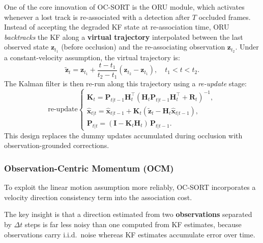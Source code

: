 \documentclass[10pt,twocolumn,letterpaper]{article}
\begin{document}
One of the core innovation of OC-SORT is the ORU module, which activates whenever a lost track is re-associated with a detection after $T$ occluded frames. Instead of accepting the degraded KF state at re-association time, ORU \textit{backtracks} the KF along a \textbf{virtual trajectory} interpolated between the last observed state $\mathbf{z}_{t_1}$ (before occlusion) and the re-associating observation $\mathbf{z}_{t_2}$. Under a constant-velocity assumption, the virtual trajectory is:
\begin{equation}
    \tilde{\mathbf{z}}_t = \mathbf{z}_{t_1} + \frac{t - t_1}{t_2 - t_1}(\mathbf{z}_{t_2} - \mathbf{z}_{t_1}),
    \quad t_1 < t < t_2.
\end{equation}
The Kalman filter is then re-run along this trajectory using a \textit{re-update} stage:
\begin{equation}
    \text{re-update}
    \begin{cases}
        \mathbf{K}_t = \mathbf{P}_{t|t-1}\mathbf{H}_t^\top
                       \left(\mathbf{H}_t \mathbf{P}_{t|t-1}\mathbf{H}_t^\top + \mathbf{R}_t\right)^{-1},\\[4pt]
        \hat{\mathbf{x}}_{t|t} = \hat{\mathbf{x}}_{t|t-1}
                       + \mathbf{K}_t\!\left(\tilde{\mathbf{z}}_t - \mathbf{H}_t\hat{\mathbf{x}}_{t|t-1}\right),\\[4pt]
        \mathbf{P}_{t|t} = (\mathbf{I} - \mathbf{K}_t\mathbf{H}_t)\,\mathbf{P}_{t|t-1}.
    \end{cases}
\end{equation}
This design replaces the dummy updates accumulated during occlusion with observation-grounded corrections.

\subsubsection{Observation-Centric Momentum (OCM)}

To exploit the linear motion assumption more reliably, OC-SORT incorporates a velocity direction consistency term into the association cost. 

The key insight is that a direction estimated from two \textbf{observations} separated by $\Delta t$ steps is far less noisy than one computed from KF estimates, because observations carry i.i.d.\ noise whereas KF estimates accumulate error over time.
\end{document}
